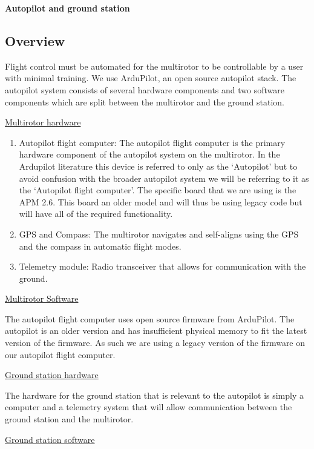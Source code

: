 \textbf{Autopilot and ground station}

\subsection{Overview}

Flight control must be automated for the multirotor to be controllable by a user with minimal training. We use ArduPilot, an open source autopilot stack. The autopilot system consists of several hardware components and two software components which are split between the multirotor and the ground station.

\underline{Multirotor hardware}\

\begin{enumerate}

    \item Autopilot flight computer: The autopilot flight computer is the primary hardware component of the autopilot system on the multirotor. In the Ardupilot literature this device is referred to only as the ‘Autopilot’ but to avoid confusion with the broader autopilot system we will be referring to it as the ‘Autopilot flight computer’. The specific board that we are using is the APM 2.6. This board an older model and will thus be using legacy code but will have all of the required functionality.
  
  \item GPS and Compass: The multirotor navigates and self-aligns using the GPS and the compass in automatic flight modes.
 
 \item Telemetry module: Radio transceiver that allows for communication with the ground.
 
\end{enumerate}

\underline{Multirotor Software}

The autopilot flight computer uses open source firmware from ArduPilot. The autopilot is an older version and has insufficient physical memory to fit the latest version of the firmware. As such we are using a legacy version of the firmware on our autopilot flight computer.

\underline{Ground station hardware}

The hardware for the ground station that is relevant to the autopilot is simply a computer and a telemetry system that will allow communication between the ground station and the multirotor.

\underline{Ground station software}

